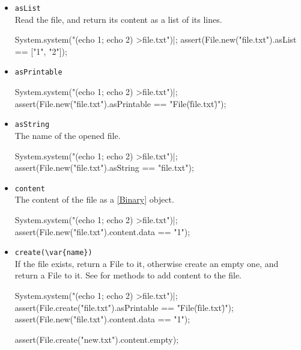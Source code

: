 \begin{itemize}
\item \lstinline|asList|\\
  Read the file, and return its content as a list of its lines.
\begin{urbiscript}[firstnumber=last]
System.system("(echo 1; echo 2) >file.txt")|;
assert(File.new("file.txt").asList == ["1", "2"]);
\end{urbiscript}

\item \lstinline|asPrintable|\\
\begin{urbiscript}[firstnumber=last]
System.system("(echo 1; echo 2) >file.txt")|;
assert(File.new("file.txt").asPrintable == "File(\"file.txt\")");
\end{urbiscript}


\item \lstinline|asString|\\
  The name of the opened file.
\begin{urbiscript}[firstnumber=last]
System.system("(echo 1; echo 2) >file.txt")|;
assert(File.new("file.txt").asString == "file.txt");
\end{urbiscript}

\item \lstinline|content|\\
  The content of the file as a \ref{Binary} object.
\begin{urbiscript}[firstnumber=last]
System.system("(echo 1; echo 2) >file.txt")|;
assert(File.new("file.txt").content.data == "1\n");
\end{urbiscript}

\item \lstinline|create(\var{name})|\\
  If the file  exists, return a File to it, otherwise create
  an empty one, and return a File to it.  See 
  for methods to add content to the file.
\begin{urbiscript}[firstnumber=last]
System.system("(echo 1; echo 2) >file.txt")|;
assert(File.create("file.txt").asPrintable == "File(\"file.txt\")");
assert(File.new("file.txt").content.data == "1\n");

assert(File.create("new.txt").content.empty);
\end{urbiscript}
\end{itemize}


